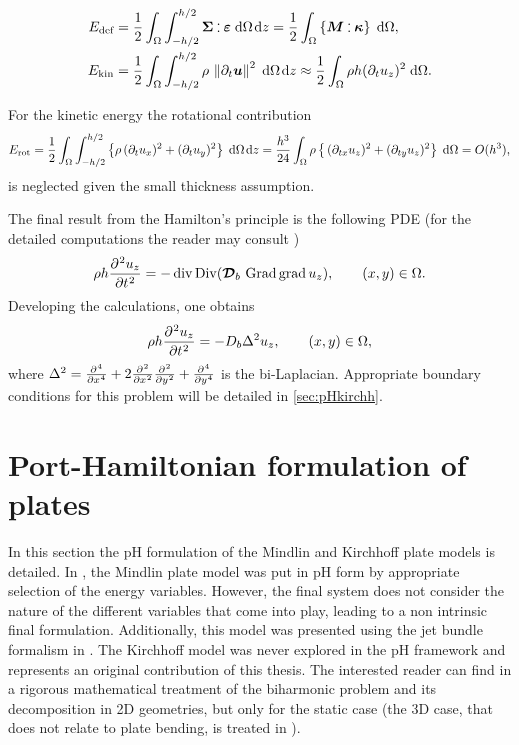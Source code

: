 \begin{align}
E_{\text{def}} &= \frac{1}{2} \int_{\Omega} \int_{-h/2}^{h/2} \bm{\Sigma} \cddot \bm{\varepsilon} \d{\Omega} \d{z} = \frac{1}{2} \int_{\Omega} \left\{\bm{M} \cddot \bm{\kappa}\right\}\d{\Omega}, \label{eq:defenKir}\\
E_{\text{kin}} &= \frac{1}{2}  \int_{\Omega} \int_{-h/2}^{h/2} \rho \, \norm{\partial_t \bm{u}}^2 \d{\Omega} \d{z} \approx \frac{1}{2} \int_{\Omega} \rho h (\partial_t u_z)^2  \d{\Omega}. \label{eq:kinenKir}
\end{align}
\begin{remark}\label{rmk:rotary}
For the kinetic energy the rotational contribution 
\begin{equation*}
E_{\text{rot}} =  \frac{1}{2}  \int_{\Omega} \int_{-h/2}^{h/2} \left\{\rho \, (\partial_t u_x)^2 + (\partial_t u_y)^2 \right\} \d{\Omega} \d{z} = \frac{h^3}{24} \int_{\Omega} \rho \left\{ \, (\partial_{tx} u_z)^2 + (\partial_{ty} u_z)^2 \right\} \d{\Omega} = O(h^3),
\end{equation*}
is neglected given the small thickness assumption.
\end{remark}
The final result from the Hamilton's principle is the following PDE (for the detailed computations the reader may consult \cite[Chapter 3]{reddy2006theory})
\begin{equation}\label{eq:classKir}
\rho h \diffp[2]{u_z}{t} = - \div\Div (\bm{\mathcal{D}}_b\, \Grad\grad{u_z}), \qquad (x,y) \in \Omega.
\end{equation}
Developing the calculations, one obtains
\begin{equation*}
\rho h \diffp[2]{u_z}{t} = - D_b \Delta^2 u_z, \qquad (x,y) \in \Omega,
\end{equation*}
where $\Delta^2 = \diffp[4]{}{x} + 2\diffp[2]{}{x}\diffp[2]{}{y} + \diffp[4]{}{y}$ is the bi-Laplacian. Appropriate boundary conditions for this problem will be detailed in \ref{sec:pHkirchh}.


\section{Port-Hamiltonian formulation of plates}
In this section the pH formulation of the Mindlin and Kirchhoff plate models is detailed. In \cite{macchelli2005mindlin}, the Mindlin plate model was put in pH form by appropriate selection of the energy variables. However, the final system does not consider the nature of the different variables that come into play, leading to a non intrinsic final formulation. Additionally, this model was presented using the jet bundle formalism in \cite{schoberl2017mindlin}. The Kirchhoff model was never explored in the pH framework and represents an original contribution of this thesis. The interested reader can find in \cite{rafetseder2018siam} a rigorous mathematical treatment of the biharmonic problem and its decomposition in 2D geometries, but only for the static case (the 3D case, that does not relate to plate bending, is treated in \cite{pauly2018divdiv}). 

